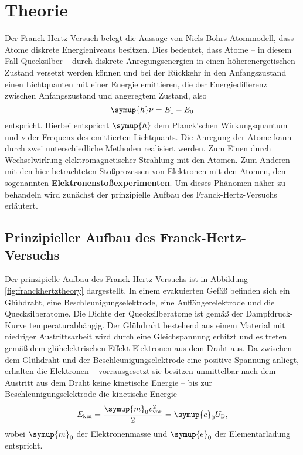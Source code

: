 \section{Theorie}
\label{sec:Theorie}

Der Franck-Hertz-Versuch belegt die Aussage von Niels Bohrs Atommodell, dass Atome diskrete 
Energieniveaus besitzen. 
Dies bedeutet, dass Atome -- in diesem Fall Quecksilber -- durch diskrete Anregungsenergien 
in einen höherenergetischen Zustand versetzt werden können und bei der Rückkehr in den 
Anfangszustand einen Lichtquanten mit einer Energie emittieren, die der Energiedifferenz zwischen
Anfangszustand und angeregtem Zustand, also
\begin{equation}
	\symup{h} \nu = E_1 - E_0
\end{equation}
entspricht. Hierbei entspricht $\symup{h}$ dem Planck'schen Wirkungsquantum und $\nu$ der
Frequenz des emittierten Lichtquants.
Die Anregung der Atome kann durch zwei unterschiedliche Methoden realisiert werden.
Zum Einen durch Wechselwirkung elektromagnetischer Strahlung mit den Atomen.
Zum Anderen mit den hier betrachteten Stoßprozessen von Elektronen mit den Atomen, den 
sogenannten \textbf{Elektronenstoßexperimenten}.
Um dieses Phänomen näher zu behandeln wird zunächst der prinzipielle Aufbau des 
Franck-Hertz-Versuchs erläutert.
\subsection{Prinzipieller Aufbau des Franck-Hertz-Versuchs}
Der prinzipielle Aufbau des Franck-Hertz-Versuchs ist in Abbildung \ref{fig:franckhertztheory}
dargestellt.
In einem evakuierten Gefäß befinden sich ein Glühdraht, eine Beschleunigungselektrode, eine
Auffängerelektrode und die Quecksilberatome. 
Die Dichte der Quecksilberatome ist gemäß der Dampfdruck-Kurve temperaturabhängig.
Der Glühdraht bestehend aus einem Material mit niedriger Austrittsarbeit wird durch eine 
Gleichspannung erhitzt und es treten gemäß dem glühelektrischen Effekt Elektronen 
aus dem Draht aus.
Da zwischen dem Glühdraht und der Beschleunigungselektrode eine positive Spannung anliegt,
erhalten die Elektronen -- vorrausgesetzt sie besitzen unmittelbar nach dem Austritt aus dem
Draht keine kinetische Energie -- bis zur Beschleunigungselektrode die kinetische Energie 
\begin{equation}
	E_{\mathrm{kin}} = \frac{\symup{m}_0 v_{\mathrm{vor}}^2}{2} = \symup{e}_0 U_{\mathrm{B}} \mathrm{,}
\end{equation}
wobei $\symup{m}_0$ der Elektronenmasse und $\symup{e}_0$ der Elementarladung entspricht.

\cite{Anleitung}
